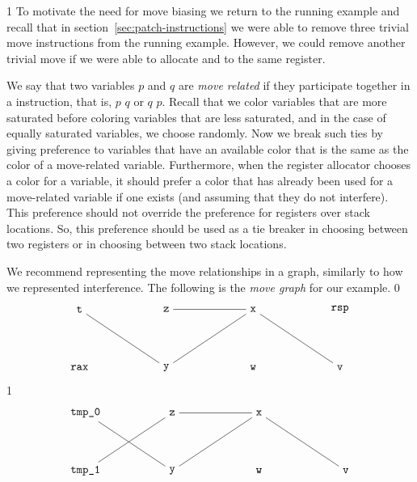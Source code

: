 \documentclass[7x10]{TimesAPriori_MIT}%
\def\racketEd{0}
\def\pythonEd{1}
\def\edition{1}
\newcommand{\pythonColor}[0]{}
\numberwithin{theorem}{chapter}
\numberwithin{definition}{chapter}
\numberwithin{equation}{chapter}
\begin{document}
{\if\edition\pythonEd\pythonColor
%
To motivate the need for move biasing we return to the running example
and recall that in section~\ref{sec:patch-instructions} we were able to
remove three trivial move instructions from the running
example. However, we could remove another trivial move if we were able
to allocate  and  to the same register.  \fi}

We say that two variables $p$ and $q$ are \emph{move
related} if they participate together in
a  instruction, that is,  $p$\key{,} $q$ or
 $q$\key{,} $p$.
%
Recall that we color variables that are more saturated before coloring
variables that are less saturated, and in the case of equally
saturated variables, we choose randomly. Now we break such ties by
giving preference to variables that have an available color that is
the same as the color of a move-related variable.
%
Furthermore, when the register allocator chooses a color for a
variable, it should prefer a color that has already been used for a
move-related variable if one exists (and assuming that they do not
interfere). This preference should not override the preference for
registers over stack locations. So, this preference should be used as
a tie breaker in choosing between two registers or in choosing between
two stack locations.

We recommend representing the move relationships in a graph, similarly
to how we represented interference.  The following is the \emph{move
  graph} for our example.
{\if\edition\racketEd      
\[
\begin{tikzpicture}[baseline=(current  bounding  box.center),scale=0.9]
\node (rax) at (0,0) {$\ttm{rax}$};
\node (rsp) at (9,2) {$\ttm{rsp}$};
\node (t) at (0,2) {$\ttm{t}$};
\node (z) at (3,2)  {$\ttm{z}$};
\node (x) at (6,2)  {$\ttm{x}$};
\node (y) at (3,0)  {$\ttm{y}$};
\node (w) at (6,0)  {$\ttm{w}$};
\node (v) at (9,0)  {$\ttm{v}$};

\draw (v) to (x);
\draw (x) to (y);
\draw (x) to (z);
\draw (y) to (t);
\end{tikzpicture}
\]
\fi}
%
{\if\edition\pythonEd\pythonColor
\[
\begin{tikzpicture}[baseline=(current  bounding  box.center),scale=0.9]
\node (t0) at (0,2) {$\ttm{tmp\_0}$};
\node (t1) at (0,0) {$\ttm{tmp\_1}$};
\node (z) at (3,2)  {$\ttm{z}$};
\node (x) at (6,2)  {$\ttm{x}$};
\node (y) at (3,0)  {$\ttm{y}$};
\node (w) at (6,0)  {$\ttm{w}$};
\node (v) at (9,0)  {$\ttm{v}$};

\draw (y) to (t0);
\draw (z) to (x);
\draw (z) to (t1);
\draw (x) to (y);
\draw (x) to (v);
\end{tikzpicture}
\]
\fi}
\end{document}
